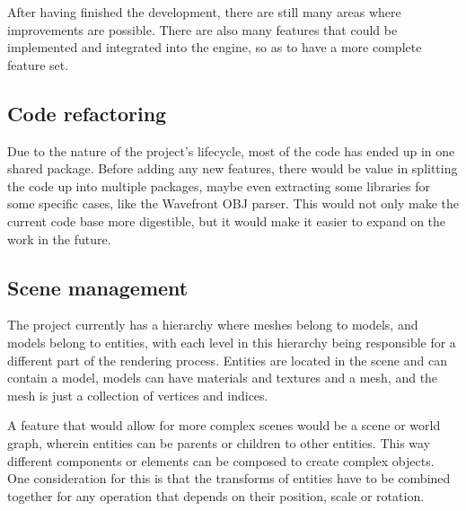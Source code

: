 
\label{SEC:RECOMMENDATIONS}

After having finished the development,
there are still many areas where improvements are possible.
There are also many features that could be implemented and integrated into the engine,
so as to have a more complete feature set.

\subsection{Code refactoring}

Due to the nature of the project's lifecycle,
most of the code has ended up in one shared package.
Before adding any new features,
there would be value in splitting the code up into multiple packages,
maybe even extracting some libraries for some specific cases,
like the Wavefront OBJ parser.
This would not only make the current code base more digestible,
but it would make it easier to expand on the work in the future.

\subsection{Scene management}

The project currently has a hierarchy where meshes belong to models,
and models belong to entities,
with each level in this hierarchy being responsible for a different part of the rendering process.
Entities are located in the scene and can contain a model,
models can have materials and textures and a mesh,
and the mesh is just a collection of vertices and indices.

A feature that would allow for more complex scenes would be a scene or world graph,
wherein entities can be parents or children to other entities.
This way different components or elements can be composed to create complex objects.
One consideration for this is that the transforms of entities have to be combined together for any operation that depends on their position, scale or rotation.

